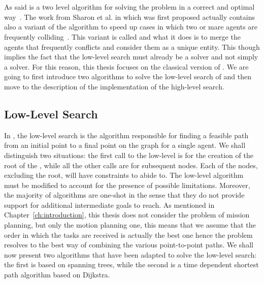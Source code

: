 \section{}
\label{sec:cbsAlgo}
As said \cbs is a two level algorithm for solving the  problem in a
correct and optimal way~\cite{MAPF_overview}. The work from Sharon et al. in
which \cbs was first proposed actually contains also a variant of the algorithm
to speed up cases in which two or mare agents are frequently
colliding~\cite{CBS}. This variant is called  and what it does is
to merge the agents that frequently conflicts and consider them as a unique
entity. This though implies the fact that the low-level search must already be
a  solver and not simply a  solver. For this reason, this
thesis focuses on the classical version of \cbs. \newline
We are going to first introduce two algorithms to solve the low-level search of
\cbs and then move to the description of the implementation of the high-level
search.
%
%
\subsection{Low-Level Search}
In \cbs, the low-level search is the algorithm responsible for finding a
feasible path from an initial point to a final point on the graph for a single
agent. We shall distinguish two situations: the first call to the low-level is
for the creation of the root of the , while all the other calls are
for subsequent nodes. Each of the nodes, excluding the root, will have
constraints to abide to. The low-level algorithm must be modified to account
for the presence of possible limitations. \newline 
Moreover, the majority of  algorithms are one-shot in the sense that
they do not provide support for additional intermediate goals to reach. As
mentioned in Chapter~\ref{ch:introduction}, this thesis does not consider the
problem of mission planning, but only the motion planning one, this means that
we assume that the order in which the tasks are received is actually the best
one hence the problem resolves to the best way of combining the various
point-to-point paths. \newline
We shall now present two algorithms that have been adapted to solve the
low-level search: the first is based on spanning trees, while the second is a
time dependent shortest path algorithm based on Dijkstra. 
%

